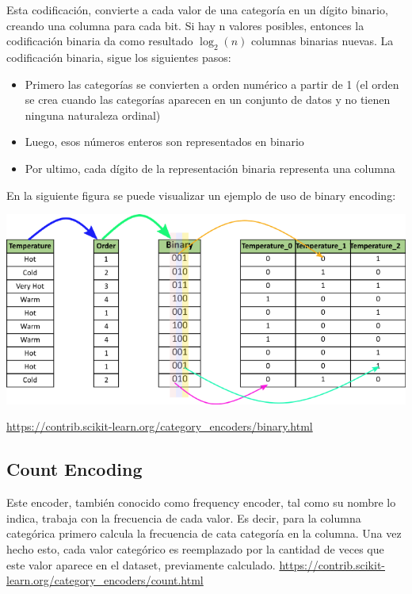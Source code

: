 \documentclass[12pt,a4paper]{article}
\begin{document}
Esta codificación, convierte a cada valor de una categoría en un dígito binario, creando una columna para cada bit. Si hay n valores posibles, entonces la codificación binaria da como resultado $\log _{2}(n)$ columnas binarias nuevas.\newline
\newline
La codificación binaria, sigue los siguientes pasos:
\begin{itemize}
    \item Primero las categorías se convierten a orden numérico a partir de 1 (el orden se crea cuando las categorías aparecen en un conjunto de datos y no tienen ninguna naturaleza ordinal)
    \item Luego, esos números enteros son representados en binario
    \item Por ultimo, cada dígito de la representación binaria representa una columna 
\end{itemize}

En la siguiente figura se puede visualizar un ejemplo de uso de binary encoding:

\begin{center}
    \includegraphics[scale=0.5]{imgs/binary-encoding.png}
\end{center}

\url{https://contrib.scikit-learn.org/category_encoders/binary.html}

\subsection{Count Encoding}
Este encoder, también conocido como frequency encoder, tal como su nombre lo indica, trabaja con la frecuencia de cada valor. Es decir, para la columna categórica primero calcula la frecuencia de cata categoría en la columna. Una vez hecho esto, cada valor categórico es reemplazado por la cantidad de veces que este valor aparece en el dataset, previamente calculado.
\url{https://contrib.scikit-learn.org/category_encoders/count.html}
\end{document}
